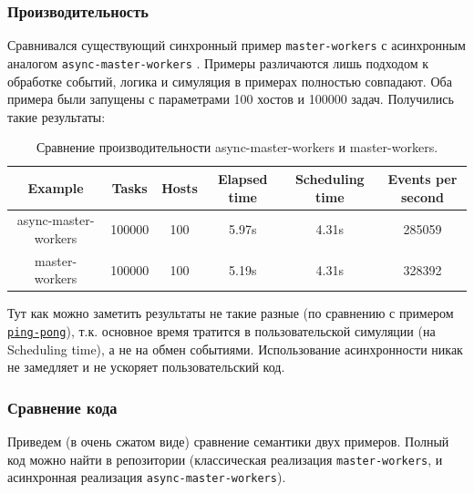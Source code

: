 \subsubsection{Производительность}

Сравнивался существующий синхронный пример \texttt{master-workers} \cite{master-workers-example} с асинхронным аналогом \texttt{async-master-workers} \cite{async-master-workers-example}. Примеры различаются лишь подходом к обработке событий, логика и симуляция в примерах полностью совпадают. Оба примера были запущены с параметрами 100 хостов и 100000 задач. Получились такие результаты:

\begin{table}[H]
    \centering
    \begin{tabular}{|c|c|c|c|c|c|}
        \hline
        Example & Tasks & Hosts & Elapsed time & Scheduling time & Events per second \\
        \hline
        async-master-workers & 100000 & 100 & 5.97s & 4.31s & 285059 \\
        \hline
        master-workers & 100000 & 100 & 5.19s & 4.31s & 328392 \\
        \hline
    \end{tabular}
    \caption{Сравнение производительности async-master-workers и master-workers.}
    \label{cmp:master-workers}
\end{table}

Тут как можно заметить результаты не такие разные (по сравнению с примером \hyperref[cmp:ping-pong]{\texttt{ping-pong}}), т.к. основное время тратится в пользовательской симуляции (на Scheduling time), а не на обмен событиями. Использование асинхронности никак не замедляет и не ускоряет пользовательский код. 


\subsubsection{Сравнение кода}

Приведем (в очень сжатом виде) сравнение семантики двух примеров. Полный код можно найти в репозитории (классическая реализация \texttt{master-workers}\cite{master-workers-example}, и асинхронная реализация \texttt{async-master-workers}\cite{async-master-workers-example}).

